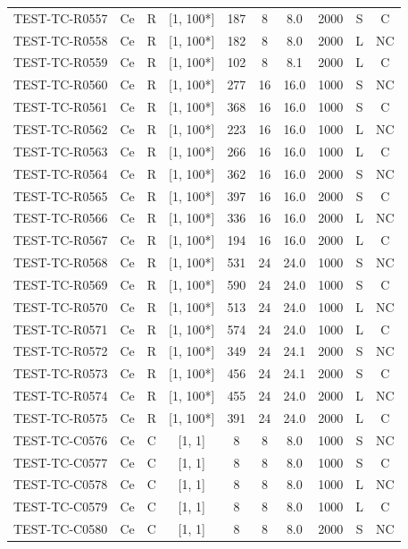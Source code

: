 \begin{longtable}{lccccccccc}
TEST-TC-R0557 & Ce & R & [1, 100*] & 187 & 8 & 8.0 & 2000 & S & C \\
TEST-TC-R0558 & Ce & R & [1, 100*] & 182 & 8 & 8.0 & 2000 & L & NC \\
TEST-TC-R0559 & Ce & R & [1, 100*] & 102 & 8 & 8.1 & 2000 & L & C \\
TEST-TC-R0560 & Ce & R & [1, 100*] & 277 & 16 & 16.0 & 1000 & S & NC \\
TEST-TC-R0561 & Ce & R & [1, 100*] & 368 & 16 & 16.0 & 1000 & S & C \\
TEST-TC-R0562 & Ce & R & [1, 100*] & 223 & 16 & 16.0 & 1000 & L & NC \\
TEST-TC-R0563 & Ce & R & [1, 100*] & 266 & 16 & 16.0 & 1000 & L & C \\
TEST-TC-R0564 & Ce & R & [1, 100*] & 362 & 16 & 16.0 & 2000 & S & NC \\
TEST-TC-R0565 & Ce & R & [1, 100*] & 397 & 16 & 16.0 & 2000 & S & C \\
TEST-TC-R0566 & Ce & R & [1, 100*] & 336 & 16 & 16.0 & 2000 & L & NC \\
TEST-TC-R0567 & Ce & R & [1, 100*] & 194 & 16 & 16.0 & 2000 & L & C \\
TEST-TC-R0568 & Ce & R & [1, 100*] & 531 & 24 & 24.0 & 1000 & S & NC \\
TEST-TC-R0569 & Ce & R & [1, 100*] & 590 & 24 & 24.0 & 1000 & S & C \\
TEST-TC-R0570 & Ce & R & [1, 100*] & 513 & 24 & 24.0 & 1000 & L & NC \\
TEST-TC-R0571 & Ce & R & [1, 100*] & 574 & 24 & 24.0 & 1000 & L & C \\
TEST-TC-R0572 & Ce & R & [1, 100*] & 349 & 24 & 24.1 & 2000 & S & NC \\
TEST-TC-R0573 & Ce & R & [1, 100*] & 456 & 24 & 24.1 & 2000 & S & C \\
TEST-TC-R0574 & Ce & R & [1, 100*] & 455 & 24 & 24.0 & 2000 & L & NC \\
TEST-TC-R0575 & Ce & R & [1, 100*] & 391 & 24 & 24.0 & 2000 & L & C \\
TEST-TC-C0576 & Ce & C & [1, 1] & 8 & 8 & 8.0 & 1000 & S & NC \\
TEST-TC-C0577 & Ce & C & [1, 1] & 8 & 8 & 8.0 & 1000 & S & C \\
TEST-TC-C0578 & Ce & C & [1, 1] & 8 & 8 & 8.0 & 1000 & L & NC \\
TEST-TC-C0579 & Ce & C & [1, 1] & 8 & 8 & 8.0 & 1000 & L & C \\
TEST-TC-C0580 & Ce & C & [1, 1] & 8 & 8 & 8.0 & 2000 & S & NC \\

\end{longtable}
